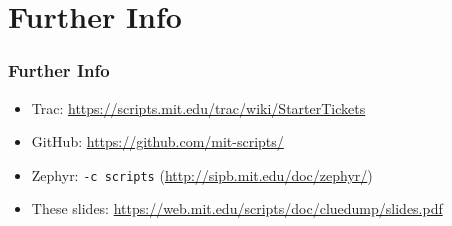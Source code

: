 \section{Further Info}
\begin{frame}
  \frametitle{Further Info}
  \begin{itemize}
  \item Trac: \url{https://scripts.mit.edu/trac/wiki/StarterTickets}
  \item GitHub: \url{https://github.com/mit-scripts/}
  \item Zephyr: \texttt{-c scripts} (\url{http://sipb.mit.edu/doc/zephyr/})
  \item These slides: \url{https://web.mit.edu/scripts/doc/cluedump/slides.pdf}
  \end{itemize}
\end{frame}
